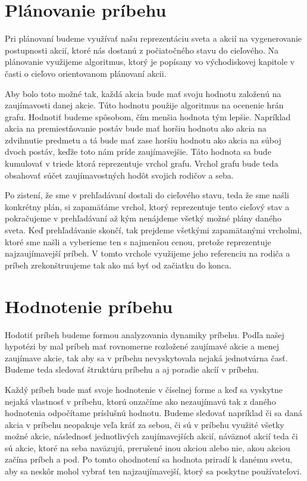 \section{Plánovanie príbehu}
Pri plánovaní budeme využívať našu reprezentáciu sveta a akcií na vygenerovanie postupnosti akcií, ktoré nás dostanú z počiatočného stavu do cieľového. Na plánovanie využijeme algoritmus, ktorý je popísany vo východiskovej kapitole v časti o cieľovo orientovanom plánovaní akcii.\par
Aby bolo toto možné tak, každá akcia bude mať svoju hodnotu založenú na zaujímavosti danej akcie. Túto hodnotu použije algoritmus na ocenenie hrán grafu. Hodnotiť budeme spôsobom, čím menšia hodnota tým lepšie. Napríklad akcia na premiestňovanie postáv bude mať horšiu hodnotu ako akcia na zdvihnutie predmetu a tá bude mať zase horšiu hodnotu ako akcia na súboj dvoch postáv, keďže toto nám príde zaujímavejšie. Táto hodnota sa bude kumulovať v triede ktorá reprezentuje vrchol grafu. Vrchol grafu bude teda obsahovať súčet zaujímavostných hodôt svojich rodičov a seba.\par
Po zistení, že sme v prehľadávaní dostali do cieľového stavu, teda že sme našli konkrétny plán, si zapamäťáme vrchol, ktorý reprezentuje tento cieľový stav a pokračujeme v prehľadávaní až kým nenájdeme všetký možné plány daného sveta. Keď prehľadávanie skončí, tak prejdeme všetkými zapamätanými vrcholmi, ktoré sme našli a vyberieme ten s najmenšou cenou, pretože reprezentuje najzaujímavejší príbeh. V tomto vrchole využijeme jeho referenciu na rodiča a príbeh zrekonštruujeme tak ako má byť od začiatku do konca.
\section{Hodnotenie príbehu}
Hodotiť príbeh budeme formou analyzovania dynamiky príbehu. Podľa našej hypotézi by mal príbeh mať rovnomerne rozložené zaujímavé akcie a menej zaujímave akcie, tak aby sa v príbehu nevyskytovala nejaká jednotvárna časť. Budeme teda sledovať štruktúru príbehu a aj poradie akcíí v príbehu.\par
Každý príbeh bude mať svoje hodnotenie v číselnej forme a keď sa vyskytne nejaká vlastnosť v príbehu, ktorú onzačíme ako nezaujímavú tak z daného hodnotenia odpočítame príslušnú hodnotu. Budeme sledovať napríklad či sa daná akcia v príbehu neopakuje veľa kráť za sebou, či sú v príbehu využité všetky možné akcie, následnosť jednotlivých zaujímavejších akcií, náväznoť akcií teda či sú akcie, ktoré na seba naväzujú, prerušené inou akciou alebo nie, akou akciou začína príbeh a pod. Po tomto ohodnotení sa hodnota priradí k danému svetu, aby sa neskôr mohol vybrať ten najzaujímavejší, ktorý sa poskytne používateľovi.

